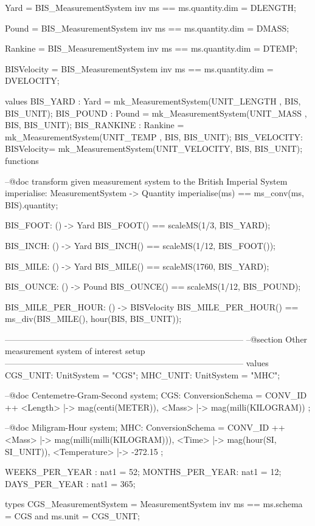 \documentclass[a4paper]{article}
\begin{document}
\begin{vdm_al}
 Yard = BIS_MeasurementSystem
 inv ms == ms.quantity.dim = DLENGTH;
 
 Pound = BIS_MeasurementSystem
 inv ms == ms.quantity.dim = DMASS;
 
 Rankine = BIS_MeasurementSystem
 inv ms == ms.quantity.dim = DTEMP;
 
 BISVelocity = BIS_MeasurementSystem
 inv ms == ms.quantity.dim = DVELOCITY;
 
values
 BIS_YARD    : Yard       = mk_MeasurementSystem(UNIT_LENGTH  , BIS, BIS_UNIT);
 BIS_POUND   : Pound      = mk_MeasurementSystem(UNIT_MASS    , BIS, BIS_UNIT);
 BIS_RANKINE : Rankine    = mk_MeasurementSystem(UNIT_TEMP    , BIS, BIS_UNIT);
  BIS_VELOCITY: BISVelocity= mk_MeasurementSystem(UNIT_VELOCITY, BIS, BIS_UNIT);
functions
 
 --@doc transform given measurement system to the British Imperial System
 imperialise: MeasurementSystem -> Quantity
 imperialise(ms) == ms_conv(ms, BIS).quantity;

 BIS_FOOT: () -> Yard
 BIS_FOOT() == scaleMS(1/3, BIS_YARD);

 BIS_INCH: () -> Yard
 BIS_INCH() == scaleMS(1/12, BIS_FOOT());
 
 BIS_MILE: () -> Yard
 BIS_MILE() == scaleMS(1760, BIS_YARD);

 BIS_OUNCE: () -> Pound
 BIS_OUNCE() == scaleMS(1/12, BIS_POUND);
 
 BIS_MILE_PER_HOUR: () -> BISVelocity
 BIS_MILE_PER_HOUR() == ms_div(BIS_MILE(), hour(BIS, BIS_UNIT));
        
------------------------------------------------------------------------------------
--@section Other measurement system of interest setup
------------------------------------------------------------------------------------
values 
 CGS_UNIT: UnitSystem = "CGS";
 MHC_UNIT: UnitSystem = "MHC";
 
 
 --@doc Centemetre-Gram-Second system; 
 CGS: ConversionSchema = CONV_ID ++ { <Length> |-> mag(centi(METER)), <Mass> |-> mag(milli(KILOGRAM)) };

 --@doc Miligram-Hour system;
 MHC: ConversionSchema = CONV_ID ++ { <Mass> |-> mag(milli(milli(KILOGRAM))), <Time> |-> mag(hour(SI, SI_UNIT)), <Temperature> |-> -272.15 };
 
 WEEKS_PER_YEAR : nat1 = 52;
 MONTHS_PER_YEAR: nat1 = 12;
 DAYS_PER_YEAR  : nat1 = 365;

types
 CGS_MeasurementSystem = MeasurementSystem
 inv ms == ms.schema = CGS and ms.unit = CGS_UNIT;
 

\end{vdm_al}
\end{document}
